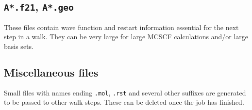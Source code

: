 \subsection{{\tt A*.f21}, {\tt A*.geo}}

These files contain wave function and restart information
essential for the next step in a walk.  They can be very large for
large MCSCF calculations and/or large basis sets.

\subsection{Miscellaneous files}

Small files with names ending \verb|.mol|, \verb|.rst| and several
other suffixes are generated to be passed to other walk steps.
These can be deleted once the job has finished.
